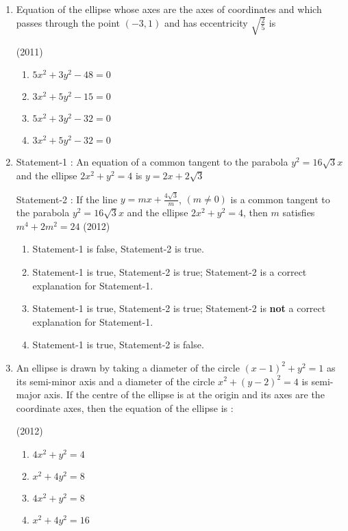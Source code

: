 \documentclass[journal,12pt,twocolumn]{IEEEtran}
\theoremstyle{remark}
\begin{document}
\begin{enumerate}
    \item Equation of the ellipse whose axes are the axes of coordinates and which passes through the point $(-3,1)$ and has eccentricity $\sqrt{\frac{2}{5}}$ is
    
    \hfill(2011)
    
    \begin{enumerate}
    \item$5x^2+3y^2-48=0$
    \item$3x^2+5y^2-15=0$
    \item$5x^2+3y^2-32=0$ 
    \item$3x^2+5y^2-32=0$ 
    \end{enumerate}

    \item
    Statement-1 : An equation of a common tangent to the parabola $y^2=16\sqrt{3}x$ and the ellipse $2x^2+y^2=4$ is $y=2x+2\sqrt{3}$
    
    Statement-2 : If the line $y=mx+\frac{4\sqrt{3}}{m}$, $(m\neq0)$ is a common tangent to the parabola $y^2=16\sqrt{3}x$ and the ellipse $2x^2+y^2=4$, then $m$ satisfies $m^4+2m^2=24$ 
    \hfill(2012)
    \begin{enumerate}
    \item Statement-1 is false, Statement-2 is true.
    \item Statement-1 is true, Statement-2 is true; Statement-2 is a correct explanation for Statement-1.
    \item Statement-1 is true, Statement-2 is true; Statement-2 is \textbf{not} a correct explanation for Statement-1.
    \item Statement-1 is true, Statement-2 is false.
    \end{enumerate}
    \item An ellipse is drawn by taking a diameter of the circle $(x-1)^2+y^2=1$ as its semi-minor axis and a diameter of the circle $x^2+(y-2)^2=4$ is semi-major axis. If the centre of the ellipse is at the origin and its axes are the coordinate axes, then the equation of the ellipse is : 
   
    \hfill(2012)
    
    \begin{enumerate}
    \item$4x^2+y^2=4$
    \item$x^2+4y^2=8$
    \item$4x^2+y^2=8$
    \item$x^2+4y^2=16$ 
    \end{enumerate}


\end{enumerate}
\end{document}
